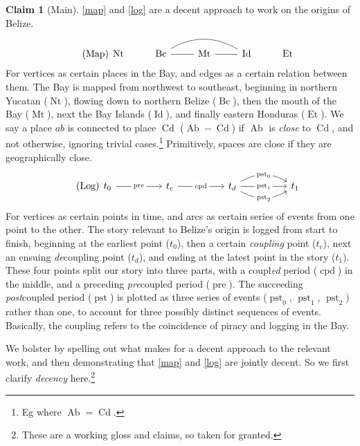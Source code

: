 \documentclass{amsart}
\newcommand{\mention}[1]{\textit{#1}}%
\DeclareMathOperator{\id}{Id}%
\DeclareMathOperator{\mt}{Mt}%
\DeclareMathOperator{\bc}{Bc}%
\DeclareMathOperator{\et}{Et}%
\DeclareMathOperator{\nt}{Nt}%
\DeclareMathOperator{\ab}{Ab}%
\DeclareMathOperator{\cd}{Cd}%
\DeclareMathOperator{\pre}{pre}%
\DeclareMathOperator{\pst}{pst}%
\DeclareMathOperator{\cpd}{cpd}%
\theoremstyle{definition}%
\theoremstyle{definition}%
\theoremstyle{remark}%
\theoremstyle{definition}%
\newtheorem*{claim*}{Claim}
\theoremstyle{definition}%
\begin{document}
\begin{claim*}[Main]
\label{clm:main}
\ref{map} and \ref{log} are a decent approach to work on the origins of Belize.%
%
\begin{equation}
\tag{Map}
\label{map}
\begin{tikzcd}[arrows=dash]
\nt &\bc \rar \ar[rr,bend left] &\mt \rar &\id &\et
\end{tikzcd}
\end{equation}
%
For vertices as certain places in the Bay, and edges as a certain relation between them. The Bay is mapped from northwest to southeast, beginning in northern Yucatan (\(\nt\)), flowing down to northern Belize (\(\bc\)), then the mouth of the Bay (\(\mt\)), next the Bay Islands (\(\id\)), and finally eastern Honduras (\(\et\)). We say a place \(ab\) is connected to place \(\cd\) (\(\ab-\cd\)) if \(\ab\) is \mention{close} to \(\cd\), and not otherwise, ignoring trivial cases.\footnote{Eg where \(\ab=\cd\).} Primitively, spaces are close if they are geographically close.
%
\begin{equation}
\tag{Log}
\label{log}
\begin{tikzcd}[sep=huge]
t_{0} \rar["\pre" description] &t_{c} \rar["\cpd" description] &t_{d} \rar[bend left,"\pst_{0}" description] \rar["\pst_{1}" description] \rar[bend right,"\pst_{2}" description] &t_{1}
\end{tikzcd}
\end{equation}
%
For vertices as certain points in time, and arcs as certain series of events from one point to the other. The story relevant to Belize's origin is logged from start to finish, beginning at the earliest point (\(t_{0}\)), then a certain \mention{coupling} point (\(t_{c}\)), next an ensuing \mention{de}coupling point (\(t_{d}\)), and ending at the latest point in the story (\(t_{1}\)). These four points split our story into three parts, with a coupl\mention{ed} period (\(\cpd\)) in the middle, and a preceding \mention{pre}coupled period (\(\pre\)). The succeeding \mention{post}coupled period (\(\pst\)) is plotted as three series of events (\(\pst_{0}\), \(\pst_{1}\), \(\pst_{2}\)) rather than one, to account for three possibly distinct sequences of events. Basically, the coupling refers to the coincidence of piracy and logging in the Bay.
\end{claim*}
%
%
We bolster  by spelling out what makes for a decent approach to the relevant work, and then demonstrating that \ref{map} and \ref{log} are jointly decent. So we first clarify \mention{decency} here.\footnote{These are a working gloss and claims, so taken for granted.}
\end{document}
